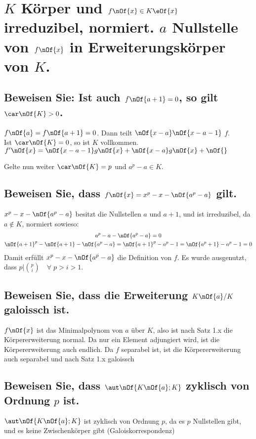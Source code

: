 \section{$K$ Körper und $f\nOf{x}\in K \eOf{x}$ irreduzibel, normiert. $a$ Nullstelle von $f\nOf{x}$ in Erweiterungskörper von $K$.}

\subsection{Beweisen Sie: Ist auch $f\nOf{a + 1} = 0$, so gilt $\car\nOf{K} > 0$.}
$f\nOf{a} = f\nOf{a+1} = 0$. Dann teilt $\nOf{x-a}\nOf{x-a-1}$ $f$.\\
Ist $\car\nOf{K} = 0$, so ist $K$ vollkommen.
$f'\nOf{x} = \nOf{x-a-1}g\nOf{x} + \nOf{x-a}g\nOf{x} + \nOf{}$

Gelte nun weiter $\car\nOf{K} = p$ und $a^p - a \in K$.
\subsection{Beweisen Sie, dass $f\nOf{x} = x^p - x - \nOf{a^p - a}$ gilt.}
$x^p - x - \nOf{a^p - a}$ besitzt die Nullstellen $a$ und $a+1$, und ist irreduzibel, da $a\notin K$, normiert sowieso:
\begin{gather}
	a^p - a - \nOf{a^p - a} = 0 \\
	\nOf{a+1}^p - \nOf{a+1} - \nOf{a^p-a} = \nOf{a+1}^p - a^p - 1 = \nOf{a^p + 1} - a^p - 1 = 0
\end{gather}
Damit erfüllt $x^p - x - \nOf{a^p - a}$ die Definition von $f$. Es wurde ausgenutzt, dass $p|\binom{p}{i} \quad \forall\; p > i > 1$.

\subsection{Beweisen Sie, dass die Erweiterung $K\nOf{a}/K$ galoissch ist.}
$f\nOf{x}$ ist das Minimalpolynom von $a$ über $K$, also ist nach Satz 1.x die Körpererweiterung normal. Da nur ein Element adjungiert wird, ist die Körpererweiterung auch endlich. Da $f$ separabel ist, ist die Körpererweiterung auch separabel und nach Satz 1.x galoissch

\subsection{Beweisen Sie, dass $\aut\nOf{K\nOf{a};K}$ zyklisch von Ordnung $p$ ist.}
$\aut\nOf{K\nOf{a};K}$ ist zyklisch von Ordnung $p$, da es $p$ Nullstellen gibt, und es keine Zwischenkörper gibt (Galoiskorrespondenz) 